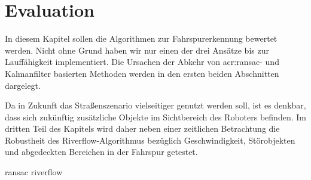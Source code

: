 \chapter{Evaluation \dcfirstauthorshort}
\label{cha:evaluation}

In diesem Kapitel sollen die Algorithmen zur Fahrspurerkennung bewertet werden. Nicht ohne Grund haben wir nur einen der drei Ansätze bis zur Lauffähigkeit implementiert. Die Ursachen der Abkehr von \gls{acr:ransac}- und Kalmanfilter basierten Methoden werden in den ersten beiden Abschnitten dargelegt. 

Da in Zukunft das Straßenszenario vielseitiger genutzt werden soll, ist es denkbar, dass sich zukünftig zusätzliche Objekte im Sichtbereich des Roboters befinden. Im dritten Teil des Kapitels wird daher neben einer zeitlichen Betrachtung die Robustheit des Riverflow-Algorithmus bezüglich Geschwindigkeit, Störobjekten und abgedeckten Bereichen in der Fahrspur getestet.

{ransac}
{riverflow}
